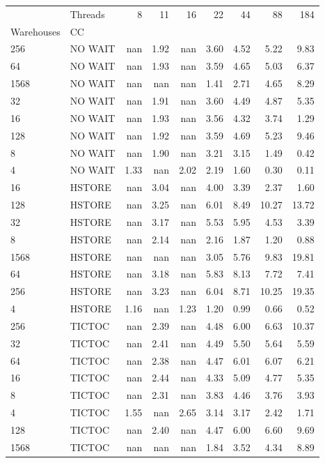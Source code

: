\begin{tabular}{llrrrrrrr}
\toprule
     & Threads &  8   &  11  &  16  &  22  &  44  &   88  &   184 \\
Warehouses & CC &      &      &      &      &      &       &       \\
\midrule
256  & NO WAIT &  nan & 1.92 &  nan & 3.60 & 4.52 &  5.22 &  9.83 \\
64   & NO WAIT &  nan & 1.93 &  nan & 3.59 & 4.65 &  5.03 &  6.37 \\
1568 & NO WAIT &  nan &  nan &  nan & 1.41 & 2.71 &  4.65 &  8.29 \\
32   & NO WAIT &  nan & 1.91 &  nan & 3.60 & 4.49 &  4.87 &  5.35 \\
16   & NO WAIT &  nan & 1.93 &  nan & 3.56 & 4.32 &  3.74 &  1.29 \\
128  & NO WAIT &  nan & 1.92 &  nan & 3.59 & 4.69 &  5.23 &  9.46 \\
8    & NO WAIT &  nan & 1.90 &  nan & 3.21 & 3.15 &  1.49 &  0.42 \\
4    & NO WAIT & 1.33 &  nan & 2.02 & 2.19 & 1.60 &  0.30 &  0.11 \\
16   & HSTORE &  nan & 3.04 &  nan & 4.00 & 3.39 &  2.37 &  1.60 \\
128  & HSTORE &  nan & 3.25 &  nan & 6.01 & 8.49 & 10.27 & 13.72 \\
32   & HSTORE &  nan & 3.17 &  nan & 5.53 & 5.95 &  4.53 &  3.39 \\
8    & HSTORE &  nan & 2.14 &  nan & 2.16 & 1.87 &  1.20 &  0.88 \\
1568 & HSTORE &  nan &  nan &  nan & 3.05 & 5.76 &  9.83 & 19.81 \\
64   & HSTORE &  nan & 3.18 &  nan & 5.83 & 8.13 &  7.72 &  7.41 \\
256  & HSTORE &  nan & 3.23 &  nan & 6.04 & 8.71 & 10.25 & 19.35 \\
4    & HSTORE & 1.16 &  nan & 1.23 & 1.20 & 0.99 &  0.66 &  0.52 \\
256  & TICTOC &  nan & 2.39 &  nan & 4.48 & 6.00 &  6.63 & 10.37 \\
32   & TICTOC &  nan & 2.41 &  nan & 4.49 & 5.50 &  5.64 &  5.59 \\
64   & TICTOC &  nan & 2.38 &  nan & 4.47 & 6.01 &  6.07 &  6.21 \\
16   & TICTOC &  nan & 2.44 &  nan & 4.33 & 5.09 &  4.77 &  5.35 \\
8    & TICTOC &  nan & 2.31 &  nan & 3.83 & 4.46 &  3.76 &  3.93 \\
4    & TICTOC & 1.55 &  nan & 2.65 & 3.14 & 3.17 &  2.42 &  1.71 \\
128  & TICTOC &  nan & 2.40 &  nan & 4.47 & 6.00 &  6.60 &  9.69 \\
1568 & TICTOC &  nan &  nan &  nan & 1.84 & 3.52 &  4.34 &  8.89 \\
\bottomrule
\end{tabular}
